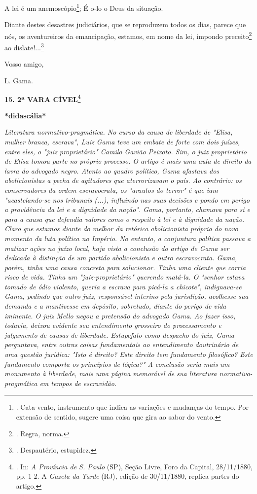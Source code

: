 A lei é um anemoscópio\footnote{. Cata-vento, instrumento que indica as
  variações e mudanças do tempo. Por extensão de sentido, sugere uma
  coisa que gira ao sabor do vento.}; É o-lo o Deus da situação.

Diante destes desastres judiciários, que se reproduzem todos os dias,
parece que nós, os aventureiros da emancipação, estamos, em nome da lei,
impondo preceito\footnote{. Regra, norma.} ao dislate!...\footnote{.
  Despautério, estupidez.}

Vosso amigo,

L. Gama.

\textbf{15. 2ª VARA CÍVEL}\footnote{. In: \emph{A Província de S. Paulo}
  (SP), Seção Livre, Foro da Capital, 28/11/1880, pp. 1-2. A
  \emph{Gazeta da Tarde} (RJ)\emph{,} edição de 30/11/1880, replica
  partes do artigo.}

\textbf{*didascália*}

\emph{Literatura normativo-pragmática. No curso da causa de liberdade de
"Elisa, mulher branca, escrava", Luiz Gama teve um embate de forte com
dois juízes, entre eles, o "juiz proprietário" Camilo Gavião Peixoto.
Sim, o juiz proprietário de Elisa tomou parte no próprio processo. O
artigo é mais uma aula de direito da lavra do advogado negro. Atento ao
quadro político, Gama afastava dos abolicionistas a pecha de agitadores
que aterrorizavam o país. Ao contrário: os conservadores da ordem
escravocrata, os "arautos do terror" é que iam "acastelando-se nos
tribunais (...), influindo nas suas decisões e pondo em perigo a
providência da lei e a dignidade da nação". Gama, portanto, chamava para
si e para a causa que defendia valores como o respeito à lei e à
dignidade da nação. Claro que estamos diante do melhor da retórica
abolicionista própria do novo momento da luta política no Império. No
entanto, a conjuntura política passava a matizar ações no juízo local,
haja vista a conclusão do artigo de Gama ser dedicada à distinção de um
partido abolicionista e outro escravocrata. Gama, porém, tinha uma causa
concreta para solucionar. Tinha uma cliente que corria risco de vida.
Tinha um "juiz-proprietário" querendo matá-la. O "senhor estava tomado
de ódio violento, queria a escrava para picá-la a chicote", indignava-se
Gama, pedindo que outro juiz, responsável interino pela jurisdição,
acolhesse sua demanda e a mantivesse em depósito, sobretudo, diante do
perigo de vida iminente. O juiz Mello negou a pretensão do advogado
Gama. Ao fazer isso, todavia, deixou evidente seu entendimento grosseiro
do processamento e julgamento de causas de liberdade. Estupefato como
despacho do juiz, Gama perguntava, entre outras coisas fundamentais ao
entendimento doutrinário de uma questão jurídica: "Isto é direito? Este
direito tem fundamento filosófico? Este fundamento comporta os
princípios de lógica?" A conclusão seria mais um monumento à liberdade,
mais uma página memorável de sua literatura normativo-pragmática em
tempos de escravidão.}

